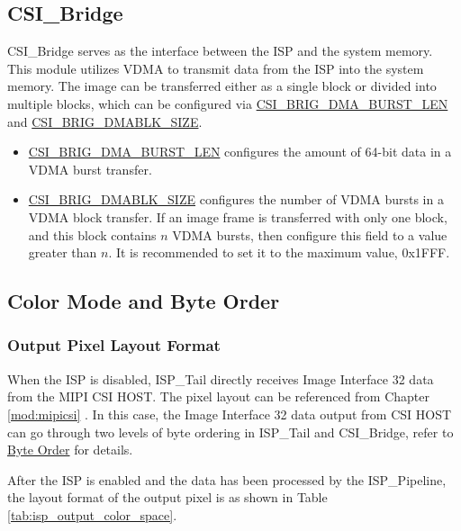 \documentclass[main\_\_EN.tex]{subfiles}
\begin{document}
\subsection{CSI\_Bridge}

CSI\_Bridge serves as the interface between the ISP and the system memory. This module utilizes VDMA to transmit data from the ISP into the system memory. The image can be transferred either as a single block or divided into multiple blocks, which can be configured via \hyperref[fielddesc:CSIBRIGDMABURSTLEN]{CSI\_BRIG\_DMA\_BURST\_LEN} and \hyperref[fielddesc:CSIBRIGDMABLKSIZE]{CSI\_BRIG\_DMABLK\_SIZE}.

\begin{itemize}
    \item \hyperref[fielddesc:CSIBRIGDMABURSTLEN]{CSI\_BRIG\_DMA\_BURST\_LEN} configures the amount of 64-bit data in a VDMA burst transfer.
    \item \hyperref[fielddesc:CSIBRIGDMABLKSIZE]{CSI\_BRIG\_DMABLK\_SIZE} configures the number of VDMA bursts in a VDMA block transfer. If an image frame is transferred with only one block, and this block contains $n$ VDMA bursts, then configure this field to a value greater than $n$. It is recommended to set it to the maximum value, 0x1FFF.
\end{itemize}


\subsection{Color Mode and Byte Order}
\subsubsection{Output Pixel Layout Format}

When the ISP is disabled, ISP\_Tail directly receives Image Interface 32 data from the MIPI CSI HOST. The pixel layout can be referenced from Chapter \ref{mod:mipicsi} \textit{}. In this case, the Image Interface 32 data output from CSI HOST can go through two levels of byte ordering in ISP\_Tail and CSI\_Bridge, refer to \hyperref[sec:isp_byte_order]{Byte Order} for details.

After the ISP is enabled and the data has been processed by the ISP\_Pipeline, the layout format of the output pixel is as shown in Table \ref{tab:isp_output_color_space}.
\end{document}

